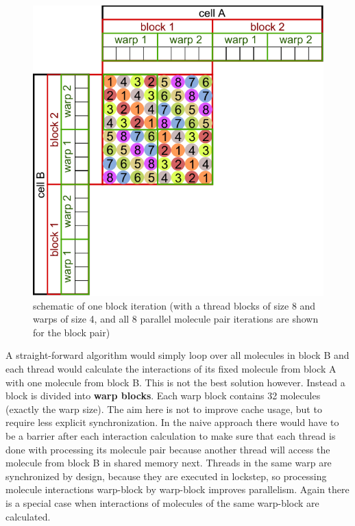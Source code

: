 \begin{figure}
\centering
\includegraphics{figures/cellprocessor_block_iteration_1.pdf}
\caption{schematic of one block iteration (with a thread blocks of size 8 and warps of size 4, and all 8 parallel molecule pair iterations are shown for the block pair)}
\end{figure}

A straight-forward algorithm would simply loop over all molecules in block B and each thread would calculate the interactions of its fixed molecule from block A with one molecule from block B.
This is not the best solution however. Instead a block is divided into \textbf{warp blocks}. Each warp block contains 32 molecules (exactly the warp size).
The aim here is not to improve cache usage, but to require less explicit synchronization.
In the naive approach there would have to be a barrier after each interaction calculation to make sure that each thread is done with processing its molecule pair because another thread will access the molecule from block B in shared memory next.
Threads in the same warp are synchronized by design, because they are executed in lockstep, so processing  molecule interactions warp-block by warp-block improves parallelism.
Again there is a special case when interactions of molecules of the same warp-block are calculated.


